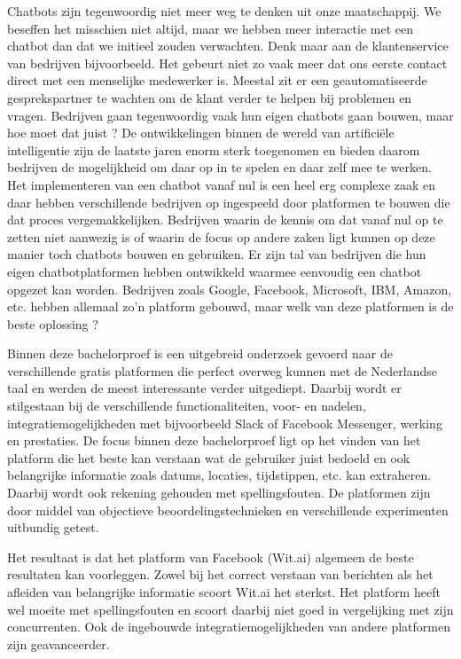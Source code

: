 Chatbots zijn tegenwoordig niet meer weg te denken uit onze maatschappij. We beseffen het misschien niet altijd, maar we hebben meer interactie met een chatbot dan dat we initieel zouden verwachten. Denk maar aan de klantenservice van bedrijven bijvoorbeeld. Het gebeurt niet zo vaak meer dat ons eerste contact direct met een menselijke medewerker is. Meestal zit er een geautomatiseerde gesprekspartner te wachten om de klant verder te helpen bij problemen en vragen. Bedrijven gaan tegenwoordig vaak hun eigen chatbots gaan bouwen, maar hoe moet dat juist ? De ontwikkelingen binnen de wereld van artificiële intelligentie zijn de laatste jaren enorm sterk toegenomen en bieden daarom bedrijven de mogelijkheid om daar op in te spelen en daar zelf mee te werken. Het implementeren van een chatbot vanaf nul is een heel erg complexe zaak en daar hebben verschillende bedrijven op ingespeeld door platformen te bouwen die dat proces vergemakkelijken. Bedrijven waarin de kennis om dat vanaf nul op te zetten niet aanwezig is of waarin de focus op andere zaken ligt kunnen op deze manier toch chatbots bouwen en gebruiken. Er zijn tal van bedrijven die hun eigen chatbotplatformen hebben ontwikkeld waarmee eenvoudig een chatbot opgezet kan worden. Bedrijven zoals Google, Facebook, Microsoft, IBM, Amazon, etc. hebben allemaal zo’n platform gebouwd, maar welk van deze platformen is de beste oplossing ?

Binnen deze bachelorproef is een uitgebreid onderzoek gevoerd naar de verschillende gratis platformen die perfect overweg kunnen met de Nederlandse taal en werden de meest interessante verder uitgediept. Daarbij wordt er stilgestaan bij de verschillende functionaliteiten, voor- en nadelen, integratiemogelijkheden met bijvoorbeeld Slack of Facebook Messenger, werking en prestaties. De focus binnen deze bachelorproef ligt op het vinden van het platform die het beste kan verstaan wat de gebruiker juist bedoeld en ook belangrijke informatie zoals datums, locaties, tijdstippen, etc. kan extraheren. Daarbij wordt ook rekening gehouden met spellingsfouten. De platformen zijn door middel van objectieve beoordelingstechnieken en verschillende experimenten uitbundig getest. 

Het resultaat is dat het platform van Facebook (Wit.ai) algemeen de beste resultaten kan voorleggen. Zowel bij het correct verstaan van berichten als het afleiden van belangrijke informatie scoort Wit.ai het sterkst. Het platform heeft wel moeite met spellingsfouten en scoort daarbij niet goed in vergelijking met zijn concurrenten. Ook de ingebouwde integratiemogelijkheden van andere platformen zijn geavanceerder.

